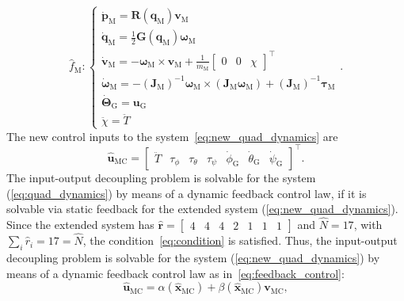 \documentclass[letterpaper, 10 pt, conference]{ieeeconf}  %
\begin{document}
\begin{equation}
\hat{f}_\text{M}:
\begin{cases}
\dot{\mathbf{p}}_\text{M} = \mathbf{R}\left(\mathbf{q}_\text{M}\right) \mathbf{v}_\text{M} \\
\dot{\mathbf{q}}_\text{M} = \frac{1}{2} \mathbf{G}\left(\mathbf{q}_\text{M}\right) \boldsymbol{\omega}_\text{M} \\
\dot{\mathbf{v}}_\text{M} = -\boldsymbol{\omega}_\text{M} \times \mathbf{v}_\text{M} + \frac{1}{m_\text{M}} \begin{bmatrix} 0 & 0 & \chi \end{bmatrix}^\top \\
\dot{\boldsymbol{\omega}}_\text{M} = -\left(\mathbf{J}_\text{M}\right)^{-1} \boldsymbol{\omega}_\text{M} \times (\mathbf{J}_\text{M} \boldsymbol{\omega}_\text{M}) + \left(\mathbf{J}_\text{M}\right)^{-1} \boldsymbol{\tau}_\text{M} \\
\dot{\boldsymbol{\Theta}}_\text{G} = \mathbf{u}_\text{G} \\
\ddot{\chi} = \ddot{T}
\end{cases}.
\label{eq:new_quad_dynamics}
\end{equation} 
The new control inputs to the system~\eqref{eq:new_quad_dynamics} are 
\begin{equation}
\hat{\mathbf{u}}_\text{MC} = \begin{bmatrix}\ddot{T} & \tau_{\phi} & \tau_{\theta} & \tau_{\psi} & \dot\phi_\text{G} & \dot\theta_\text{G} & \dot\psi_\text{G} \end{bmatrix}^\top.
\end{equation}
The input-output decoupling problem is solvable for the system (\ref{eq:quad_dynamics}) by means of a dynamic feedback control law, if it is solvable via static feedback for the extended system (\ref{eq:new_quad_dynamics}). Since the extended system has $\hat{\mathbf{r}} = \begin{bmatrix} 4 & 4 & 4 & 2 & 1 & 1 & 1 \end{bmatrix}$ and $\hat{N} = 17$, with $\sum_i \hat{r}_i = 17 = \hat{N}$, the condition~\eqref{eq:condition} is satisfied. Thus, the input-output decoupling problem is solvable for the system (\ref{eq:new_quad_dynamics}) by means of a dynamic feedback control law as in~\eqref{eq:feedback_control}:
\begin{equation}
\hat{\mathbf{u}}_\text{MC} = \alpha(\hat{\mathbf{x}}_\text{MC}) + \beta(\hat{\mathbf{x}}_\text{MC}) \mathbf{v}_\text{MC},
\label{eq:feedback_control_extended}
\end{equation}
\end{document}

